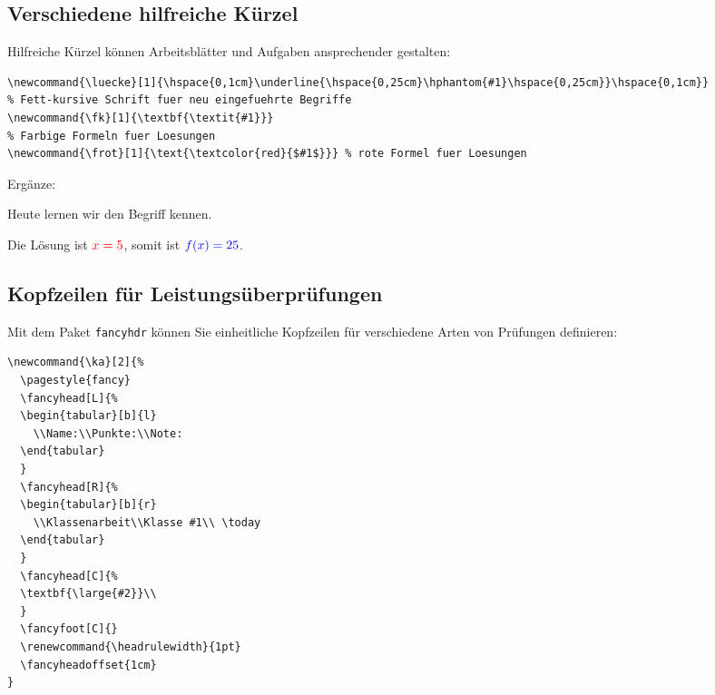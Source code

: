 \subsection{Verschiedene hilfreiche Kürzel}

Hilfreiche Kürzel können Arbeitsblätter und Aufgaben ansprechender gestalten:

\begin{lstlisting}[style=latex]
% Automatisch erstellte Luecke wie die Laenge des Textes
\newcommand{\luecke}[1]{\hspace{0,1cm}\underline{\hspace{0,25cm}\hphantom{#1}\hspace{0,25cm}}\hspace{0,1cm}}
% Fett-kursive Schrift fuer neu eingefuehrte Begriffe
\newcommand{\fk}[1]{\textbf{\textit{#1}}}
% Farbige Formeln fuer Loesungen
\newcommand{\frot}[1]{\text{\textcolor{red}{$#1$}}} % rote Formel fuer Loesungen
\end{lstlisting}

\begin{ausgabe}
Ergänze: 

Heute lernen wir den Begriff  kennen.

Die Lösung ist $\frot{x = 5}$, somit ist $\text{\textcolor{blue}{$f(x) = 25$}}$.
\end{ausgabe}



\subsection{Kopfzeilen für Leistungsüberprüfungen}

Mit dem Paket \texttt{fancyhdr} können Sie einheitliche Kopfzeilen für verschiedene Arten von Prüfungen definieren:

\begin{lstlisting}[style=latex]
% Definition Kopfzeile fuer Klassenarbeit mit \ka{Klasse}{Thema}
\newcommand{\ka}[2]{%
  \pagestyle{fancy}
  \fancyhead[L]{%
  \begin{tabular}[b]{l}
    \\Name:\\Punkte:\\Note:
  \end{tabular} 
  }
  \fancyhead[R]{%
  \begin{tabular}[b]{r}
    \\Klassenarbeit\\Klasse #1\\ \today
  \end{tabular} 
  }
  \fancyhead[C]{%
  \textbf{\large{#2}}\\
  }
  \fancyfoot[C]{}
  \renewcommand{\headrulewidth}{1pt}
  \fancyheadoffset{1cm}
}
\end{lstlisting}

